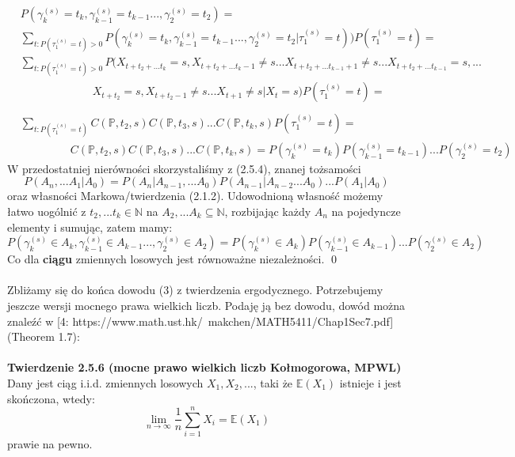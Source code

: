 \documentclass[a4paper]{article}
\begin{document}
\begin{align*}
    &P(\gamma_k^{(s)} = t_k, \gamma_{k-1}^{(s)} = t_{k-1} ..., \gamma_2^{(s)} = t_2) =\\
    &\sum\limits_{t: P(\tau_1^{(s)} = t) > 0} P(\gamma_k^{(s)} =t_k, \gamma_{k-1}^{(s)} = t_{k-1} ..., \gamma_2^{(s)} = t_2 | \tau_1^{(s)} = t))P(\tau_1^{(s)} = t) =\\
    &\sum\limits_{t: P(\tau_1^{(s)} = t) > 0} P(X_{t+t_2+...t_k} = s, X_{t+t_2+...t_k - 1} \neq s ... X_{t+t_2+...t_{k-1} + 1} \neq s ... X_{t+t_2+...t_{k-1}} = s, ...\\
    &\quad\quad\quad\quad\quad\quad\,\,\, X_{t+t_2} = s, X_{t+t_2 - 1} \neq s ... X_{t+1} \neq s|X_t = s)P(\tau_1^{(s)} = t) = \\\\
    &\sum\limits_{t: P(\tau_1^{(s)} = t)} C(\mathbb{P}, t_2, s)C(\mathbb{P}, t_3, s)...C(\mathbb{P}, t_k, s)P(\tau_1^{(s)} = t) =\\
    &\quad\quad\quad\quad\,\,\, C(\mathbb{P}, t_2, s)C(\mathbb{P}, t_3, s)...C(\mathbb{P}, t_k, s) = P(\gamma_k^{(s)} = t_k) P(\gamma_{k-1}^{(s)} = t_{k-1}) ...P(\gamma_2^{(s)} = t_2)
\end{align*}
W przedostatniej nierówności skorzystaliśmy z (2.5.4), znanej tożsamości 
$$P(A_n, ... A_1|A_0) = P(A_n|A_{n-1}, ...A_0)P(A_{n-1}|A_{n-2}...A_0)...P(A_1|A_0)$$
oraz własności Markowa/twierdzenia (2.1.2). Udowodnioną własność możemy łatwo uogólnić z $t_2, ... t_k \in \mathbb{N}$ na $A_2, ... A_k \subseteq \mathbb{N}$, rozbijając każdy $A_n$ na pojedyncze elementy i sumując, zatem mamy:
$$P(\gamma_k^{(s)} \in A_k, \gamma_{k-1}^{(s)} \in A_{k-1} ..., \gamma_2^{(s)} \in A_2) = P(\gamma_k^{(s)} \in A_k) P(\gamma_{k-1}^{(s)} \in A_{k-1}) ...P(\gamma_2^{(s)} \in A_{2})$$
Co dla \textbf{ciągu} zmiennych losowych jest równoważne niezależności. \qed
\\\\
Zbliżamy się do końca dowodu (3) z twierdzenia ergodycznego. Potrzebujemy jeszcze wersji mocnego prawa wielkich liczb. Podaję ją bez dowodu, dowód można znaleźć w [4: https://www.math.ust.hk/~makchen/MATH5411/Chap1Sec7.pdf] (Theorem 1.7):\\\\
\textbf{Twierdzenie 2.5.6 (mocne prawo wielkich liczb Kołmogorowa, MPWL)}\\
Dany jest ciąg i.i.d. zmiennych losowych $X_1, X_2, ... $, taki że $\mathbb{E}(X_1)$ istnieje i jest skończona, wtedy:
$$ \lim\limits_{n \to \infty} \frac{1}{n}\sum\limits_{i=1}^n X_i = \mathbb{E}(X_1)$$
prawie na pewno.
\end{document}

